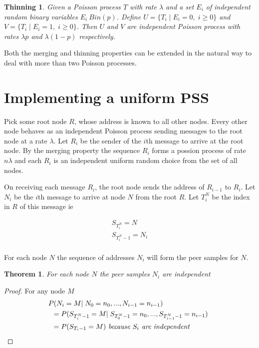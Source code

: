 \documentclass[a4paper,10pt]{article}
\newtheorem*{thm}{Theorem}
\begin{document}
\newtheorem*{thinning}{Thinning}
\begin{thinning}
Given a Poisson process $T$ with rate $\lambda$ and a set $E_i$ of independent random binary variables $E_i ~ Bin(p)$. Define $U = \{T_i \;|\; E_i = 0, \; i \geq 0\}$ and $V = \{T_i \;|\; E_i = 1, \; i \geq 0\}$. Then $U$ and $V$ are independent Poisson process with rates $\lambda p$ and $\lambda (1-p)$ respectively.
\end{thinning}

Both the merging and thinning properties can be extended in the natural way to deal with more than two Poisson processes.

\section{Implementing a uniform PSS}

Pick some root node $R$, whose address is known to all other nodes. Every other node behaves as an independent Poisson process sending messages to the root node at a rate $\lambda$. Let $R_i$ be the sender of the $i$th message to arrive at the root node. By the merging property the sequence $R_i$ forms a possion process of rate $n \lambda$ and each $R_i$ is an independent uniform random choice from the set of all nodes.

On receiving each message $R_i$, the root node sends the address of $R_{i-1}$ to $R_i$. Let $N_i$ be the $i$th message to arrive at node $N$ from the root $R$. Let $T^N_i$ be the index in $R$ of this message ie

\begin{gather*}
S_{T^N_i} = N \\
S_{T^N_i-1} = N_i \\
\end{gather*}

For each node $N$ the sequence of addresses $N_i$ will form the peer samples for $N$.

\begin{thm}For each node $N$ the peer samples $N_i$ are independent\end{thm}

\begin{proof}
For any node $M$
\begin{align*}
& \!\!\! P(N_i = M |\; N_0=n_0, ... ,N_{i-1} = n_{i-1}) \\
& = P(S_{T^N_i-1} = M |\; S_{T^N_0-1} = n_0, ... ,S_{T^N_{i-1}-1} = n_{i-1}) \\
& = P(S_{T_i-1} = M) \text{ \em because $S_i$ are independent \em} \\
\end{align*}
\end{proof}
\end{document}
